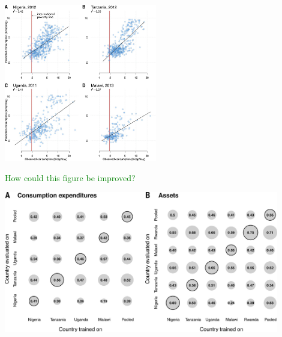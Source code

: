 \documentclass[aspectratio=169]{beamer}
\def\vf{\vfill}
\begin{document}
\begin{frame}

\begin{center}
\includegraphics[width=0.5\textwidth]{figures/jean_combining_2016_fig3}
\end{center}
\vf
\textcolor{green}{How could this figure be improved?}

\end{frame}
\begin{frame}

\begin{center}
\includegraphics[width=0.9\textwidth]{figures/jean_combining_2016_fig5}
\end{center}

\end{frame}
\end{document}
